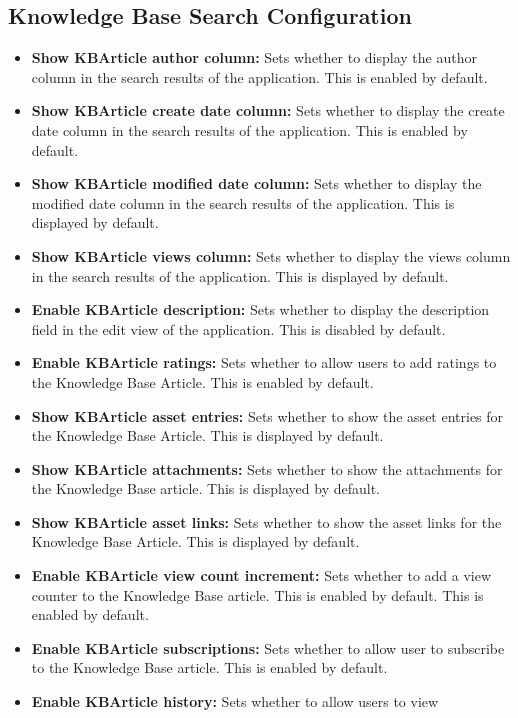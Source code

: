 \subsection{Knowledge Base Search
Configuration}\label{knowledge-base-search-configuration}

\begin{itemize}
\item
  \textbf{Show KBArticle author column:} Sets whether to display the
  author column in the search results of the application. This is
  enabled by default.
\item
  \textbf{Show KBArticle create date column:} Sets whether to display
  the create date column in the search results of the application. This
  is enabled by default.
\item
  \textbf{Show KBArticle modified date column:} Sets whether to display
  the modified date column in the search results of the application.
  This is displayed by default.
\item
  \textbf{Show KBArticle views column:} Sets whether to display the
  views column in the search results of the application. This is
  displayed by default.
\item
  \textbf{Enable KBArticle description:} Sets whether to display the
  description field in the edit view of the application. This is
  disabled by default.
\item
  \textbf{Enable KBArticle ratings:} Sets whether to allow users to add
  ratings to the Knowledge Base Article. This is enabled by default.
\item
  \textbf{Show KBArticle asset entries:} Sets whether to show the asset
  entries for the Knowledge Base Article. This is displayed by default.
\item
  \textbf{Show KBArticle attachments:} Sets whether to show the
  attachments for the Knowledge Base article. This is displayed by
  default.
\item
  \textbf{Show KBArticle asset links:} Sets whether to show the asset
  links for the Knowledge Base Article. This is displayed by default.
\item
  \textbf{Enable KBArticle view count increment:} Sets whether to add a
  view counter to the Knowledge Base article. This is enabled by
  default. This is enabled by default.
\item
  \textbf{Enable KBArticle subscriptions:} Sets whether to allow user to
  subscribe to the Knowledge Base article. This is enabled by default.
\item
  \textbf{Enable KBArticle history:} Sets whether to allow users to view

\end{itemize}
